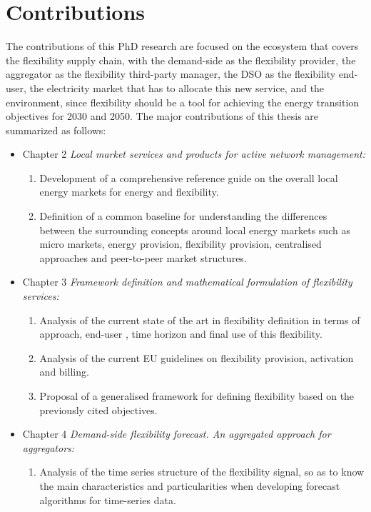 \section{Contributions}
The contributions of this PhD research are focused on the ecosystem that covers the flexibility supply chain, with the demand-side as the flexibility provider, the aggregator as the flexibility third-party manager, the DSO as the flexibility end-user, the electricity market that has to allocate this new service, and the environment, since flexibility should be a tool for achieving the energy transition objectives for 2030 and 2050. The major contributions of this thesis are summarized as follows:  
\begin{itemize}
\item Chapter 2 \textit{Local market services and products for active network management:} 
	\begin{enumerate}
		\item Development of a comprehensive reference guide on the overall local energy markets for energy and flexibility.
		\item Definition of a common baseline for understanding the differences between the surrounding concepts around local energy markets such as micro markets, energy provision, flexibility provision, centralised approaches and peer-to-peer market structures.  
	\end{enumerate}
\item Chapter 3 \textit{Framework definition and mathematical formulation of flexibility services:} 
	\begin{enumerate}
		\item Analysis of the current state of the art in flexibility definition in terms of approach, end-user , time horizon and final use of this flexibility. 
		\item Analysis of the current EU guidelines on flexibility provision, activation and billing. 
		\item Proposal of a generalised framework for defining flexibility based on the previously cited objectives. 
	\end{enumerate}
\item Chapter 4 \textit{Demand-side flexibility forecast. An aggregated approach for aggregators:} 
	\begin{enumerate}
		\item Analysis of the time series structure of the flexibility signal, so as to know the main characteristics and particularities when developing forecast algorithms for time-series data. 

\end{enumerate}
\end{itemize}
